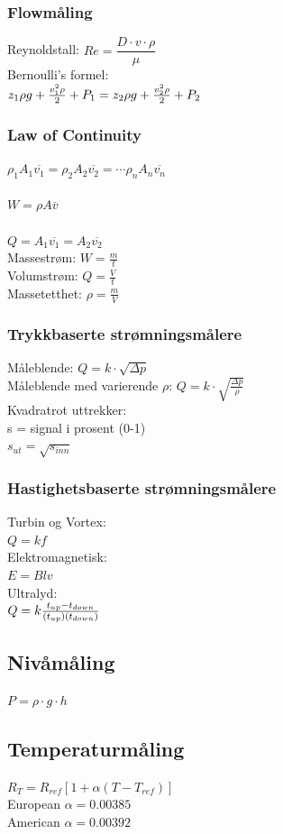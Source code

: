 \documentclass[10pt,a5paper]{article}
\begin{document}
\subsubsection*{Flowmåling}
\vskip 2.5pt 
\vskip 2.5pt 
\vskip 2.5pt 
Reynoldstall: $Re=\dfrac {D \cdot v \cdot \rho}{\mu}$\\
\vskip 2.5pt 
Bernoulli's formel:\\
$z_1 \rho g + {v_1^2 \rho \over 2} + P_1 = z_2 \rho g + {v_2^2 \rho \over 2} + P_2$\\
\vskip 2.5pt 
\subsubsection*{Law of Continuity}
$\rho_1 A_1 \overline{v_1} = \rho_2 A_2 \overline{v_2} = \cdots \rho_n A_n \overline{v_n}$\\
\\
$W = \rho A \overline{v}$\\\\
$Q=A_1 \overline{v_1} = A_2 \overline{v_2}$\\

Massestrøm: $W=\frac{m}{t}$\\
\vskip 2.5pt 
Volumstrøm: $Q=\frac{V}{t}$\\
\vskip 2.5pt 
Massetetthet: $\rho=\frac{m}{V}$\\
\vskip 2.5pt 
\subsubsection*{Trykkbaserte strømningsmålere}
Måleblende: $Q=k\cdot \sqrt{\Delta p}$\\
\vskip 2.5pt 
Måleblende med varierende $\rho$: $Q=k\cdot \sqrt{\frac{\Delta p}{\rho}}$\\
\vskip 2.5pt
Kvadratrot uttrekker:\\
s = signal i prosent (0-1)\\
$s_{ut}=\sqrt{s_{inn}}$\\
\subsubsection*{Hastighetsbaserte strømningsmålere}
Turbin og Vortex:\\
$Q=kf$\\
Elektromagnetisk:\\
$E=Blv$\\
Ultralyd:\\
$Q = k {t_{up} - t_{down} \over (t_{up})(t_{down})}$\\
 
\subsection{Nivåmåling}

$P = \rho \cdot g \cdot h $\\
\subsection{Temperaturmåling}
$R_T = R_{ref}[1 + \alpha(T - T_{ref})]$\\
European $\alpha=0.00385$\\
American $\alpha=0.00392$\\
\end{document}
